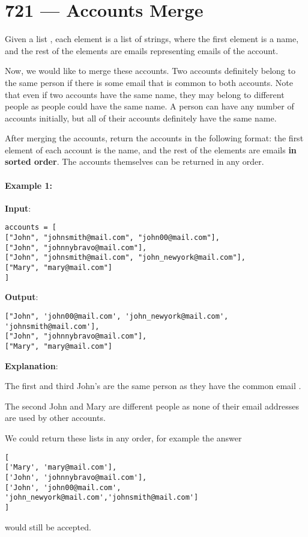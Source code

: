 \section{721 --- Accounts Merge}
Given a list , each element  is a list of strings, where the first element  is a name, and the rest of the elements are emails representing emails of the account.

Now, we would like to merge these accounts. Two accounts definitely belong to the same person if there is some email that is common to both accounts. Note that even if two accounts have the same name, they may belong to different people as people could have the same name. A person can have any number of accounts initially, but all of their accounts definitely have the same name.

After merging the accounts, return the accounts in the following format: the first element of each account is the name, and the rest of the elements are emails \textbf{in sorted order}. The accounts themselves can be returned in any order.

\paragraph{Example 1:}

\begin{flushleft}

\textbf{Input}: 

\begin{lstlisting}[style=customc]
accounts = [
["John", "johnsmith@mail.com", "john00@mail.com"],
["John", "johnnybravo@mail.com"], 
["John", "johnsmith@mail.com", "john_newyork@mail.com"], 
["Mary", "mary@mail.com"]
]
\end{lstlisting}

\textbf{Output}: 

\begin{lstlisting}[style=customc]
["John", 'john00@mail.com', 'john_newyork@mail.com', 'johnsmith@mail.com'],
["John", "johnnybravo@mail.com"],
["Mary", "mary@mail.com"]
\end{lstlisting}


\textbf{Explanation}: 

The first and third John's are the same person as they have the common email .

The second John and Mary are different people as none of their email addresses are used by other accounts.

We could return these lists in any order, for example the answer 

\begin{lstlisting}[style=customc]
[
['Mary', 'mary@mail.com'], 
['John', 'johnnybravo@mail.com'], 
['John', 'john00@mail.com', 'john_newyork@mail.com','johnsmith@mail.com']
]
\end{lstlisting}

would still be accepted.



\end{flushleft}

